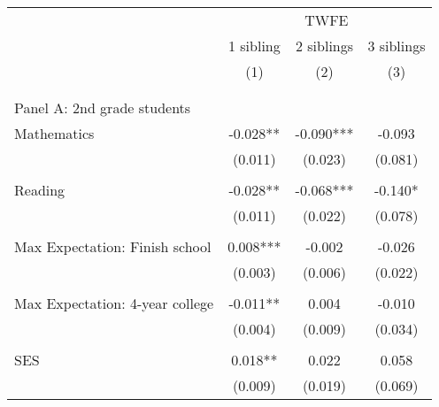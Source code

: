 \makeatletter
{}
{
\makeatother
\begin{tabular}{lccc}
\toprule
\cmidrule(lr){2-4}
& \multicolumn{3}{c}{TWFE}  \\
\cmidrule(lr){2-4}
& 1 sibling & 2 siblings & 3 siblings  \\
\cmidrule(lr){2-2} \cmidrule(lr){3-3} \cmidrule(lr){4-4}
& (1) & (2) & (3)\\
\bottomrule
&  &  &  \\
&  &  &   \\
\multicolumn{4}{l}{Panel A: 2nd grade students } \\
\hspace{3mm}Mathematics&      -0.028** &      -0.090***&      -0.093   \\
                    &     (0.011)   &     (0.023)   &     (0.081)   \\
 
&  &  &   \\
\hspace{3mm}Reading &      -0.028** &      -0.068***&      -0.140*  \\
                    &     (0.011)   &     (0.022)   &     (0.078)   \\
 
&  &  &   \\
\hspace{3mm}Max Expectation: Finish school&       0.008***&      -0.002   &      -0.026   \\
                    &     (0.003)   &     (0.006)   &     (0.022)   \\
 
&  &  &   \\
\hspace{3mm}Max Expectation: 4-year college&      -0.011** &       0.004   &      -0.010   \\
                    &     (0.004)   &     (0.009)   &     (0.034)   \\
 
&  &  &   \\
\hspace{3mm}SES     &       0.018** &       0.022   &       0.058   \\
                    &     (0.009)   &     (0.019)   &     (0.069)   \\
 

\end{tabular}}
